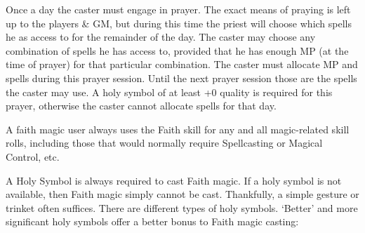 \documentclass[twoside]{book}
\begin{document}
    {  
     Once a day the caster must engage in prayer. The
               exact means of praying is left up to the players \& GM,
               but during this time the priest will choose which spells
               he as access to for the remainder of the day. The caster
               may choose any combination of spells he has access to,
               provided that he has enough MP (at the time of prayer) for
               that particular combination. The caster must allocate MP
               and spells during this prayer session. Until the next
               prayer session those are the spells the caster may use. A
               holy symbol of at least +0 quality is required for this
               prayer, otherwise the caster cannot allocate spells for
               that day. 
    }
  
    {  
     A faith magic user always uses the Faith skill for
               any and all magic-related skill rolls, including those
               that would normally require Spellcasting or Magical
               Control, etc. 
    }
  
    {  
     A Holy Symbol is always required to cast Faith
               magic. If a holy symbol is not available, then Faith magic
               simply cannot be cast. Thankfully, a simple gesture or
               trinket often suffices. There are different types of holy
               symbols. `Better' and more significant holy
               symbols offer a better bonus to Faith magic casting:
               
    }
  
\end{document}
